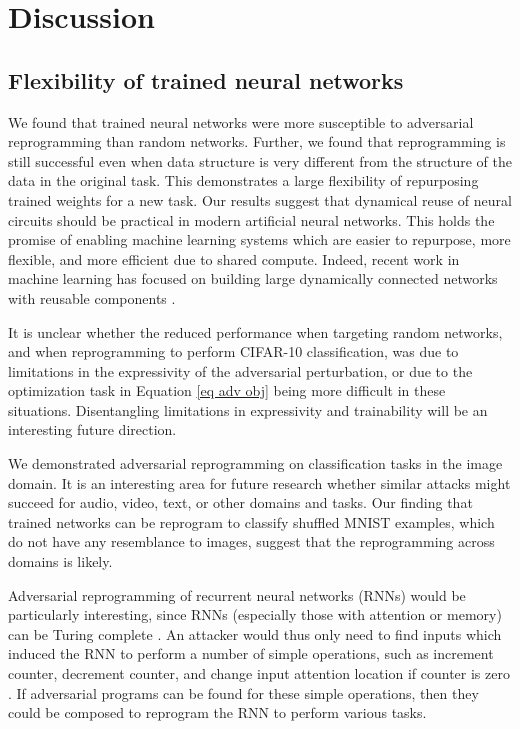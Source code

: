 \documentclass{article}
\begin{document}
\section{Discussion}\label{sec discuss}\subsection{Flexibility of trained neural networks}%
We found that trained neural networks were more susceptible to adversarial reprogramming than random networks. Further, we found that reprogramming is still successful even when data structure is very different from the structure of the data in the original task.
This demonstrates a large flexibility of repurposing trained weights for a new task. 
Our results suggest that dynamical reuse of neural circuits should 
be practical in modern artificial neural networks. 
This holds the promise of enabling machine learning systems which are easier to repurpose, more flexible, and more efficient due to shared compute. 
Indeed, recent work in machine learning has focused on building large dynamically connected networks with reusable components \citep{shazeer2017outrageously}.

It is unclear whether the reduced performance when targeting random networks, and when reprogramming to perform CIFAR-10 classification, 
was due to limitations in the expressivity of the adversarial perturbation,
or due to the optimization task in Equation \ref{eq adv obj} being more difficult in these situations. 
Disentangling limitations in expressivity and trainability will be an interesting future direction.


We demonstrated adversarial reprogramming on classification tasks in the image domain. 
It is an interesting area for future research whether similar attacks might succeed for audio, video, text, or other domains and tasks. Our finding that trained networks can be reprogram to classify shuffled MNIST examples, which do not have any resemblance to images, suggest that the reprogramming across domains is likely. 

Adversarial reprogramming of recurrent neural networks (RNNs) would be particularly interesting, since RNNs (especially those with attention or memory) can be Turing complete \citep{neelakantan2015neural}. 
An attacker would thus only need to find inputs which induced the RNN to perform a number of simple operations, such as increment counter, decrement counter, and change input attention location if counter is zero \citep{minsky1961recursive}. 
If adversarial programs can be found for these simple operations, then they could be composed to reprogram the RNN to perform various tasks.
\end{document}
